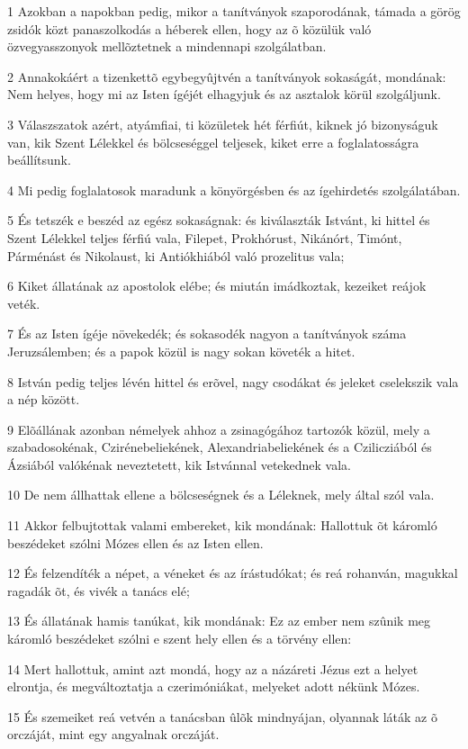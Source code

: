 \par 1 Azokban a napokban pedig, mikor a tanítványok szaporodának, támada a görög zsidók közt panaszolkodás a héberek ellen, hogy az õ közülük való özvegyasszonyok mellõztetnek a mindennapi szolgálatban.
\par 2 Annakokáért a tizenkettõ egybegyûjtvén a tanítványok sokaságát, mondának: Nem helyes, hogy mi az Isten ígéjét elhagyjuk és az asztalok körül szolgáljunk.
\par 3 Válaszszatok azért, atyámfiai, ti közületek hét férfiút, kiknek jó bizonyságuk van, kik Szent Lélekkel és bölcseséggel teljesek, kiket erre a foglalatosságra beállítsunk.
\par 4 Mi pedig foglalatosok maradunk a könyörgésben és az ígehirdetés szolgálatában.
\par 5 És tetszék e beszéd az egész sokaságnak: és kiválaszták Istvánt, ki hittel és Szent Lélekkel teljes férfiú vala, Filepet, Prokhórust, Nikánórt, Timónt, Párménást és Nikolaust, ki Antiókhiából való prozelitus vala;
\par 6 Kiket állatának az apostolok elébe; és miután imádkoztak, kezeiket reájok veték.
\par 7 És az Isten ígéje növekedék; és sokasodék nagyon a tanítványok száma Jeruzsálemben; és a papok közül is nagy sokan követék a hitet.
\par 8 István pedig teljes lévén hittel és erõvel, nagy csodákat és jeleket cselekszik vala a nép között.
\par 9 Elõállának azonban némelyek ahhoz a zsinagógához tartozók közül, mely a szabadosokénak, Czirénebeliekének, Alexandriabeliekének és a Czilicziából és Ázsiából valókénak neveztetett, kik Istvánnal vetekednek vala.
\par 10 De nem állhattak ellene a bölcseségnek és a Léleknek, mely által szól vala.
\par 11 Akkor felbujtottak valami embereket, kik mondának: Hallottuk õt káromló beszédeket szólni Mózes ellen és az Isten ellen.
\par 12 És felzendíték a népet, a véneket és az írástudókat; és reá rohanván, magukkal ragadák õt, és vivék a tanács elé;
\par 13 És állatának hamis tanúkat, kik mondának: Ez az ember nem szûnik meg káromló beszédeket szólni e szent hely ellen és a törvény ellen:
\par 14 Mert hallottuk, amint azt mondá, hogy az a názáreti Jézus ezt a helyet elrontja, és megváltoztatja a czerimóniákat, melyeket adott nékünk Mózes.
\par 15 És szemeiket reá vetvén a tanácsban ûlõk mindnyájan, olyannak láták az õ orczáját, mint egy angyalnak orczáját.

